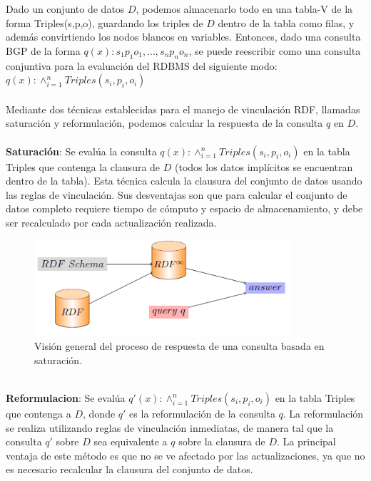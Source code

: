 \documentclass[10pt,a4paper]{article}
\begin{document}
Dado un conjunto de datos $D$, podemos almacenarlo todo en una tabla-V de la forma Triples(s,p,o), guardando los triples de $D$ dentro de la tabla como filas, y además convirtiendo los nodos blancos en variables. Entonces, dado una consulta BGP de la forma $q(x) : s_{1} p_{1} o_{1}, ..., s_{n} p_{n} o_{n}$, se puede reescribir como una consulta conjuntiva para la evaluación del RDBMS del siguiente modo:
\\
$q(x): \wedge ^n _{i = 1} Triples(s_{i}, p_{i}, o_{i})$
\\\\
Mediante dos técnicas establecidas para el manejo de vinculación RDF, llamadas saturación y reformulación, podemos calcular la respuesta de la consulta $q$ en $D$.
\\\\
\textbf{Saturación}: Se evalúa la consulta $q(x): \wedge ^n _{i = 1} Triples(s_{i}, p_{i}, o_{i})$ en la tabla Triples que contenga la clausura de $D$ (todos los datos implícitos se encuentran dentro de la tabla). Esta técnica calcula la clausura del conjunto de datos usando las reglas de vinculación. Sus desventajas son que para calcular el conjunto de datos completo requiere tiempo de cómputo y espacio de almacenamiento, y debe ser recalculado por cada actualización realizada.
\\
\begin{figure}[h]
\begin{center}
\includegraphics[width=270pt]{imgs/saturacion}
\caption{Visión general del proceso de respuesta de una consulta basada en saturación.}
\end{center}
\end{figure}
\\
\textbf{Reformulacion}: Se evalúa $q'(x): \wedge ^n _{i = 1} Triples(s_{i}, p_{i}, o_{i})$ en la tabla Triples que contenga a $D$, donde $q'$ es la reformulación de la consulta $q$. La reformulación se realiza utilizando reglas de vinculación inmediatas, de manera tal que la consulta $q'$ sobre $D$ sea equivalente a $q$ sobre la clausura de $D$. La principal ventaja de este método es que no se ve afectado por las actualizaciones, ya que no es necesario recalcular la clausura del conjunto de datos. 
\end{document}
